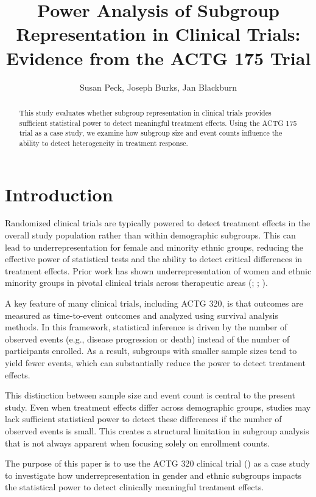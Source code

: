 \documentclass[
  letterpaper,
  DIV=11,
  numbers=noendperiod]{scrartcl}
\title{Power Analysis of Subgroup Representation in Clinical Trials:
Evidence from the ACTG 175 Trial}
\author{Susan Peck, Joseph Burks, Jan Blackburn}
\date{}
\begin{document}
\maketitle
\begin{abstract}
This study evaluates whether subgroup representation in clinical trials
provides sufficient statistical power to detect meaningful treatment
effects. Using the ACTG 175 trial as a case study, we examine how
subgroup size and event counts influence the ability to detect
heterogeneity in treatment response.
\end{abstract}


\section{Introduction}\label{introduction}

Randomized clinical trials are typically powered to detect treatment
effects in the overall study population rather than within demographic
subgroups. This can lead to underrepresentation for female and minority
ethnic groups, reducing the effective power of statistical tests and the
ability to detect critical differences in treatment effects. Prior work
has shown underrepresentation of women and ethnic minority groups in
pivotal clinical trials across therapeutic areas
(;
;
).

A key feature of many clinical trials, including ACTG 320, is that
outcomes are measured as time-to-event outcomes and analyzed using
survival analysis methods. In this framework, statistical inference is
driven by the number of observed events (e.g., disease progression or
death) instead of the number of participants enrolled. As a result,
subgroups with smaller sample sizes tend to yield fewer events, which
can substantially reduce the power to detect treatment effects.

This distinction between sample size and event count is central to the
present study. Even when treatment effects differ across demographic
groups, studies may lack sufficient statistical power to detect these
differences if the number of observed events is small. This creates a
structural limitation in subgroup analysis that is not always apparent
when focusing solely on enrollment counts.

The purpose of this paper is to use the ACTG 320 clinical trial
() as a case
study to investigate how underrepresentation in gender and ethnic
subgroups impacts the statistical power to detect clinically meaningful
treatment effects.
\end{document}
